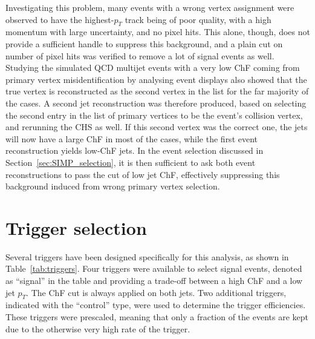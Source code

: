 Investigating this problem, many events with a wrong vertex assignment were observed to have the highest-$p_T$ track being of poor quality, with a high momentum with large uncertainty, and no pixel hits. This alone, though, does not provide a sufficient handle to suppress this background, and a plain cut on number of pixel hits was verified to remove a lot of signal events as well.
Studying the simulated \ac{QCD} multijet events with a very low ChF coming from primary vertex misidentification by analysing event displays also showed that the true vertex is reconstructed as the second vertex in the list for the far majority of the cases. A second jet reconstruction was therefore produced, based on selecting the second entry in the list of primary vertices to be the event's collision vertex, and rerunning the \ac{CHS} as well. If this second vertex was the correct one, the jets will now have a large ChF in most of the cases, while the first event reconstruction yields low-ChF jets. In the event selection discussed in Section~\ref{sec:SIMP_selection}, it is then sufficient to ask both event reconstructions to pass the cut of low jet ChF, effectively suppressing this background induced from wrong primary vertex selection.

\section{Trigger selection}
\label{sec:SIMP_trigger}

Several triggers have been designed specifically for this analysis, as shown in Table~\ref{tab:triggers}. Four triggers were available to select signal events, denoted as ``signal'' in the table and providing a trade-off between a high ChF and a low jet $p_T$. The ChF cut is always applied on both jets. Two additional triggers, indicated with the ``control'' type, were used to determine the trigger efficiencies. These triggers were prescaled, meaning that only a fraction of the events are kept due to the otherwise very high rate of the trigger.

